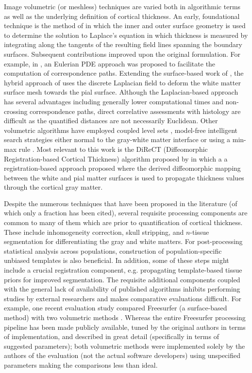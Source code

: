 Image volumetric (or meshless) techniques are varied both in algorithmic terms as well as
the underlying definition of cortical thickness.  An early, foundational technique is the 
method of \cite{jones2000} in which the inner and outer surface geometry is used to determine the
solution to Laplace's equation in which thickness is measured by integrating along the 
tangents of the resulting field lines spanning the boundary surfaces.  Subsequent contributions
improved upon the original formulation.  For example, in \cite{yezzi2003}, an Eulerian PDE approach
was proposed to facilitate the computation of correspondence paths.  Extending the surface-based
work of \cite{macdonald2000}, the hybrid approach of
\cite{kim2005} uses the discrete Laplacian field to deform the white matter surface mesh towards the 
pial surface.    Although the Laplacian-based approach has several advantages
including generally lower computational times and 
non-crossing correspondence paths, direct correlative assessments with histology
are difficult as the quantified distances 
are not necessarily Euclidean.  Other volumetric algorithms have employed coupled
level sets \citep{zeng1999}, model-free intelligent search strategies either normal to 
the gray-white matter interface \citep{scott2009} or using a min-max rule \citep{clement-vachet2011}.
Most relevant to this work is the DiReCT (Diffeomorphic Registration-based 
Cortical Thickness) algorithm proposed by \cite{das2009} in which a 
a registration-based approach proposed where the derived diffeomorphic mapping between the 
white and pial matter surfaces is used to propagate thickness values 
through the cortical gray matter.

Despite the numerous techniques that have been proposed in the literature (of which
only a fraction has been cited), several requisite processing components are 
common to many of them which are prior to quantification of cortical thickness.
These include inhomogeneity correction, skull stripping, and $n$-tissue segmentation 
for differentiating the gray and white matters.  For post-processing statistical analysis 
across populations, construction of population-specific unbiased templates
is also  beneficial.
In addition, some of these steps might include a crucial registration component, e.g. 
propagating template-based tissue priors for improved segmentation.  The requisite
additional components coupled with the general lack of availability of published
algorithms \cite{kovacevic2006} inhibits performing studies by external researchers 
and makes comparative evaluations difficult.  For example, one recent evaluation 
study \citep{clarkson2011} compared
Freesurfer (a surface-based method) with two volumetric methods \citep{jones2000,das2009}.
Whereas the entire Freesurfer processing pipeline has been made publicly available, 
tuned by the original authors in terms of implementation, and described in great detail 
(specifically in terms of suggested parameters); both volumetric methods were 
implemented solely by the authors of the evaluation (not the actual software developers) using 
unspecified parameters making the comparisons less than ideal.

